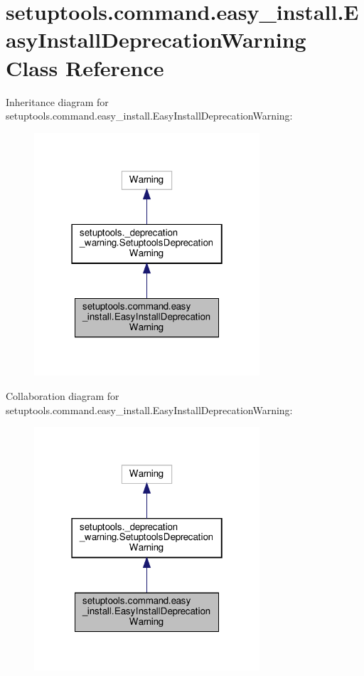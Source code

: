 \hypertarget{classsetuptools_1_1command_1_1easy__install_1_1EasyInstallDeprecationWarning}{}\section{setuptools.\+command.\+easy\+\_\+install.\+Easy\+Install\+Deprecation\+Warning Class Reference}
\label{classsetuptools_1_1command_1_1easy__install_1_1EasyInstallDeprecationWarning}


Inheritance diagram for setuptools.\+command.\+easy\+\_\+install.\+Easy\+Install\+Deprecation\+Warning\+:
\nopagebreak
\begin{figure}[H]
\begin{center}
\leavevmode
\includegraphics[width=238pt]{classsetuptools_1_1command_1_1easy__install_1_1EasyInstallDeprecationWarning__inherit__graph}
\end{center}
\end{figure}


Collaboration diagram for setuptools.\+command.\+easy\+\_\+install.\+Easy\+Install\+Deprecation\+Warning\+:
\nopagebreak
\begin{figure}[H]
\begin{center}
\leavevmode
\includegraphics[width=238pt]{classsetuptools_1_1command_1_1easy__install_1_1EasyInstallDeprecationWarning__coll__graph}
\end{center}
\end{figure}


